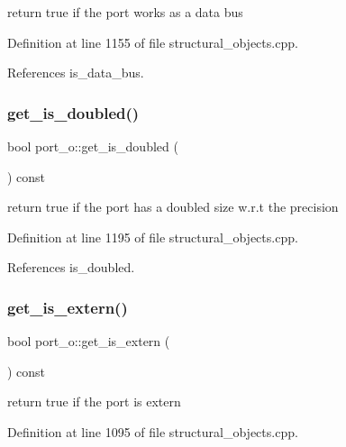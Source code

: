 return true if the port works as a data bus 



Definition at line 1155 of file structural\+\_\+objects.\+cpp.



References is\+\_\+data\+\_\+bus.

\mbox{\label{structport__o_aca824b0fb3a97416a5b3da5d26205608}} 
\subsubsection{\texorpdfstring{get\+\_\+is\+\_\+doubled()}{get\_is\_doubled()}}
{\footnotesize\ttfamily bool port\+\_\+o\+::get\+\_\+is\+\_\+doubled (\begin{DoxyParamCaption}{ }\end{DoxyParamCaption}) const}



return true if the port has a doubled size w.\+r.\+t the precision 



Definition at line 1195 of file structural\+\_\+objects.\+cpp.



References is\+\_\+doubled.

\mbox{\label{structport__o_ace21d5b503cddb14492cd553e787c093}} 
\subsubsection{\texorpdfstring{get\+\_\+is\+\_\+extern()}{get\_is\_extern()}}
{\footnotesize\ttfamily bool port\+\_\+o\+::get\+\_\+is\+\_\+extern (\begin{DoxyParamCaption}{ }\end{DoxyParamCaption}) const}



return true if the port is extern 



Definition at line 1095 of file structural\+\_\+objects.\+cpp.



